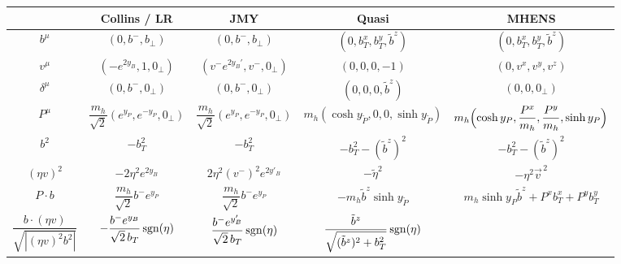 \documentclass[11pt,a4paper]{article}
\begin{document}
{
	\renewcommand{\arraystretch}{2.4}
	\begin{table}
		\centering
		\setlength{\tabcolsep}{0.2em}
		\fontsize{9}{9}\selectfont
		\begin{tabular}{|c|c|c|c|c|}
			\hline
			 \cellcolor{Snow3} & \cellcolor{OliveDrab1} {\bf Collins / LR} & \cellcolor{OliveDrab1} {\bf JMY} & \cellcolor{LightSkyBlue1} {\bf Quasi} & \cellcolor{LightSkyBlue1} {\bf MHENS}
			\\ \hline
			\cellcolor{Snow3} $b^\mu$ & $(0,b^-,b_\perp)$
            & $(0,b^-,b_\perp)$
         & $(0, b_T^x,b_T^y,\tilde b^z)$
            & $(0, b_T^x,b_T^y,\tilde b^z)$
			\\ \hline
			\cellcolor{Snow3} $v^\mu$ & $(-e^{2y_B},1,0_\perp)$
            & $(v^-e^{2y_B'},v^-,0_\perp)$
            & $(0,0,0,-1)$ 
            & $(0,v^x,v^y,v^z)$
			\\ \hline
			\cellcolor{Snow3} $\delta^\mu$ & $(0,b^-,0_\perp)$ & $(0,b^-,0_\perp)$  & $(0,0,0,\tilde b^z)$ & $(0,0,0_\perp)$
			\\ \hline
			\cellcolor{Snow3} $P^\mu$ & 
            \mbox{\scriptsize $\dfrac{m_h}{\sqrt2} (e^{y_P},e^{-y_P},0_\perp)$}
            & \mbox{\scriptsize $\dfrac{m_h}{\sqrt2}  (e^{y_P},e^{-y_P},0_\perp)$}
            & \mbox{\scriptsize $m_h(\cosh y_{\tilde P}, 0,0,\sinh y_{\tilde P})$}
			& \mbox{\scriptsize $m_h\Bigl(\cosh y_P, \dfrac{P^x}{m_h},\dfrac{P^y}{m_h},\sinh y_P \Bigr)$}
			\\
            \Xhline{7\arrayrulewidth}
			\cellcolor{RosyBrown3} $b^2$ 
            & $ - b_T^2$
            & $- b_T^2$
            & $-b_T^2 -(\tilde b^z)^2$
            & $- b_T^2-(\tilde b^z)^2$
			\\ \hline
			\cellcolor{RosyBrown3} $(\eta v)^2$ 
            & $-2\eta^2e^{2y_B}$
            & $2\eta^2(v^-)^2e^{2y'_B}$
            & $-\tilde \eta^2$ 
            & $-\eta^2 \vec v^{\,2}$ 
			\\ \hline
			\cellcolor{RosyBrown3} $P\cdot b$ 
            & $\dfrac{m_h}{\sqrt2} b^- e^{y_P}$
            & $\dfrac{m_h}{\sqrt2}  b^- e^{y_P}$
            & $-m_h\tilde b^z\sinh  y_{\tilde P}$
            & $m_h\sinh y_P \tilde b^z + P^xb^x_T + P^yb^y_T$
			\\ \hline
			 \cellcolor{RosyBrown3} \phantom{x}\hspace{-0.4cm} $\dfrac{b\cdot (\eta v)}{\sqrt{|(\eta v)^2 b^2|}}$ 
			& $-\dfrac{b^- e^{y_B}}{\sqrt{2}\,b_T}\,{\rm sgn}(\eta)$
			& $\dfrac{b^- e^{y_B'}}{\sqrt{2}\,b_T}\,{\rm sgn}(\eta)$
			& $\dfrac{\tilde b^z}{\sqrt{(\tilde b^z)^2+b_T^2}}\,{\rm sgn}(\eta)$

\end{tabular}
\end{table}}
\end{document}
